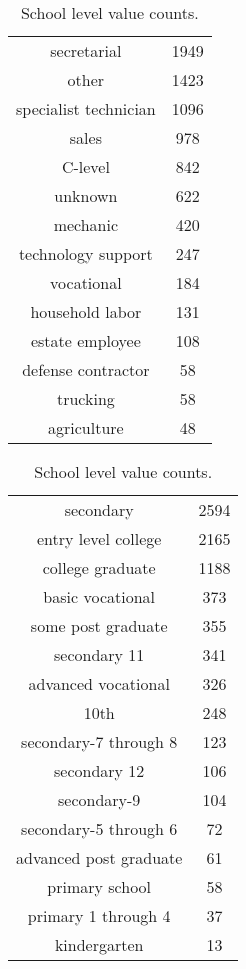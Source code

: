 \begin{table}[!h]
\begin{minipage}{.5\textwidth}
    \caption{Profession value counts.}
    \label{tab:profession_value_counts}
    \begin{tabular}{cc}
        secretarial & 1949 \\
        other & 1423 \\
        specialist technician & 1096 \\
        sales & 978 \\
        C-level & 842 \\
        unknown & 622 \\
        mechanic & 420 \\
        technology support & 247 \\
        vocational & 184 \\
        household labor & 131 \\
        estate employee & 108 \\
        defense contractor & 58 \\
        trucking & 58 \\
        agriculture & 48 \\
    \end{tabular}
    \centering
\end{minipage}
\begin{minipage}{.5\textwidth}
    \caption{School level value counts.}
    \label{tab:school_level_value_counts}
    \centering
    \begin{tabular}{cc}
        secondary & 2594 \\
        entry level college & 2165 \\
        college graduate & 1188 \\
        basic vocational & 373 \\
        some post graduate & 355 \\
        secondary 11 & 341 \\
        advanced vocational & 326 \\
        10th & 248 \\
        secondary-7 through 8 & 123 \\
        secondary 12 & 106 \\
        secondary-9 & 104 \\
        secondary-5 through 6 & 72 \\
        advanced post graduate & 61 \\
        primary school & 58 \\
        primary 1 through 4 & 37 \\
        kindergarten & 13 \\
    \end{tabular}
\end{minipage}
\end{table}


